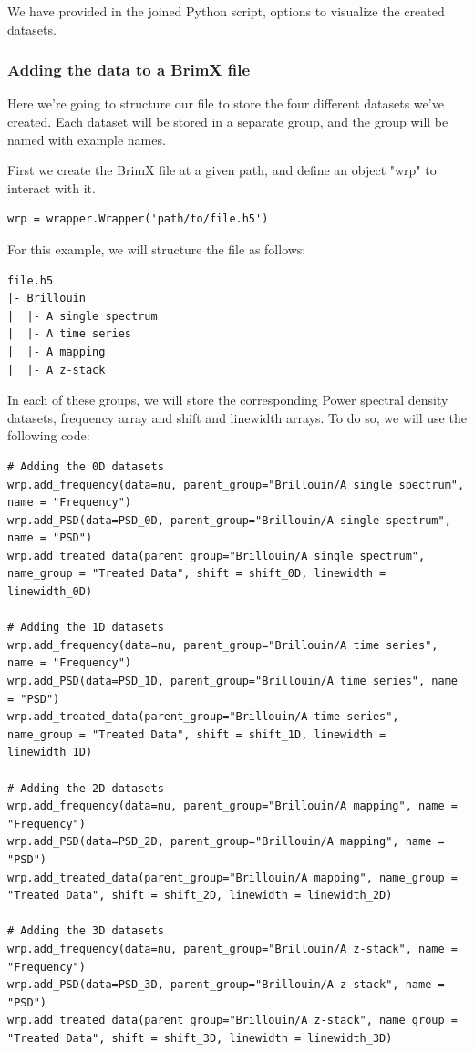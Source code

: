 \documentclass{article}
\begin{document}
We have provided in the joined Python script, options to visualize the created datasets.

\subsubsection{Adding the data to a BrimX file}

Here we're going to structure our file to store the four different datasets we've created. Each dataset will be stored in a separate group, and the group will be named with example names.

First we create the BrimX file at a given path, and define an object "wrp" to interact with it.
\begin{lstlisting}
wrp = wrapper.Wrapper('path/to/file.h5')
\end{lstlisting}

For this example, we will structure the file as follows:
\begin{verbatim}
file.h5
|- Brillouin
|  |- A single spectrum 
|  |- A time series
|  |- A mapping
|  |- A z-stack
\end{verbatim}

In each of these groups, we will store the corresponding Power spectral density datasets, frequency array and shift and linewidth arrays. To do so, we will use the following code:
\begin{lstlisting}
# Adding the 0D datasets
wrp.add_frequency(data=nu, parent_group="Brillouin/A single spectrum", name = "Frequency")
wrp.add_PSD(data=PSD_0D, parent_group="Brillouin/A single spectrum", name = "PSD")
wrp.add_treated_data(parent_group="Brillouin/A single spectrum", name_group = "Treated Data", shift = shift_0D, linewidth = linewidth_0D)

# Adding the 1D datasets
wrp.add_frequency(data=nu, parent_group="Brillouin/A time series", name = "Frequency")
wrp.add_PSD(data=PSD_1D, parent_group="Brillouin/A time series", name = "PSD")
wrp.add_treated_data(parent_group="Brillouin/A time series", name_group = "Treated Data", shift = shift_1D, linewidth = linewidth_1D)

# Adding the 2D datasets
wrp.add_frequency(data=nu, parent_group="Brillouin/A mapping", name = "Frequency")
wrp.add_PSD(data=PSD_2D, parent_group="Brillouin/A mapping", name = "PSD")
wrp.add_treated_data(parent_group="Brillouin/A mapping", name_group = "Treated Data", shift = shift_2D, linewidth = linewidth_2D)

# Adding the 3D datasets
wrp.add_frequency(data=nu, parent_group="Brillouin/A z-stack", name = "Frequency")
wrp.add_PSD(data=PSD_3D, parent_group="Brillouin/A z-stack", name = "PSD")
wrp.add_treated_data(parent_group="Brillouin/A z-stack", name_group = "Treated Data", shift = shift_3D, linewidth = linewidth_3D)
\end{lstlisting}
\end{document}
